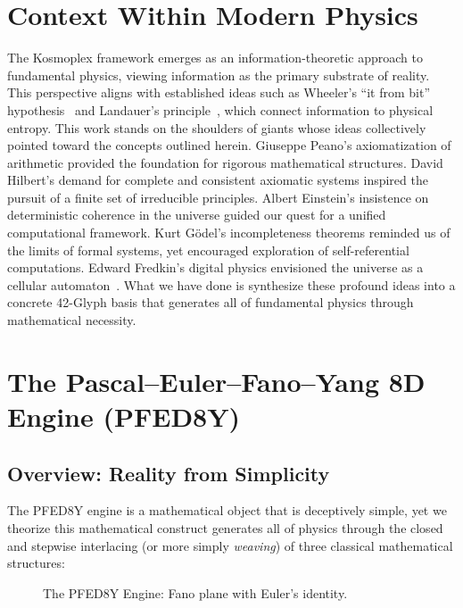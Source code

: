 \documentclass[pdflatex,sn-mathphys-num]{sn-jnl}
\theoremstyle{thmstyleone}
\theoremstyle{thmstyletwo}
\theoremstyle{thmstylethree}
\begin{document}
\section{Context Within Modern Physics}\label{sec:s1-context}
The Kosmoplex framework emerges as an information-theoretic approach to fundamental physics, viewing information as the primary substrate of reality. This perspective aligns with established ideas such as Wheeler's ``it from bit'' hypothesis~\cite{wheeler1990} and Landauer's principle~\cite{landauer1961}, which connect information to physical entropy.
This work stands on the shoulders of giants whose ideas collectively pointed toward the concepts outlined herein. Giuseppe Peano's axiomatization of arithmetic provided the foundation for rigorous mathematical structures. David Hilbert's demand for complete and consistent axiomatic systems inspired the pursuit of a finite set of irreducible principles. Albert Einstein's insistence on deterministic coherence in the universe guided our quest for a unified computational framework. Kurt G\"{o}del's incompleteness theorems reminded us of the limits of formal systems, yet encouraged exploration of self-referential computations. Edward Fredkin's digital physics envisioned the universe as a cellular automaton~\cite{wolfram2002,fredkin1990,zuse1969}. What we have done is synthesize these profound ideas into a concrete 42-Glyph basis that generates all of fundamental physics through mathematical necessity.

\section{The Pascal--Euler--Fano--Yang 8D Engine (PFED8Y)}\label{sec:s1-PFED8Y}

\subsection{Overview: Reality from Simplicity}\label{subsec:s1-overview}

The PFED8Y engine is a mathematical object that is deceptively simple, yet we theorize this mathematical construct generates all of physics through the closed and stepwise interlacing (or more simply \textit{weaving}) of three classical mathematical structures:

\begin{figure}[h]
\centering
{}
\caption{The PFED8Y Engine: Fano plane with Euler's identity.}
\label{fig:s1-PFED8Y}
\end{figure}
\end{document}
